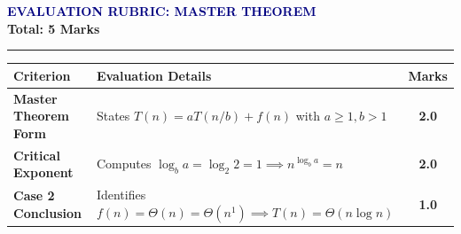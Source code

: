 \documentclass[11pt,a4paper]{article}
\begin{document}
\begin{center}
    {\large\bfseries\textcolor{navy}{EVALUATION RUBRIC: MASTER THEOREM}}\\[0.1cm]
    {\normalsize\textbf{Total: 5 Marks}}
\end{center}
\hrule
\vspace{0.6cm}

\begin{table}[h]
\centering
\begin{tabular}{p{4cm} p{8cm} c}
\toprule
\textbf{Criterion} & \textbf{Evaluation Details} & \textbf{Marks} \\
\midrule
\textbf{Master Theorem Form} & States $T(n) = aT(n/b) + f(n)$ with $a \ge 1, b > 1$ & \textbf{2.0} \\[0.3cm]
\textbf{Critical Exponent} & Computes $\log_b a = \log_2 2 = 1 \implies n^{\log_b a} = n$ & \textbf{2.0} \\[0.3cm]
\textbf{Case 2 Conclusion} & Identifies $f(n) = \Theta(n) = \Theta(n^1) \implies T(n) = \Theta(n \log n)$ & \textbf{1.0} \\
\bottomrule
\end{tabular}
\end{table}
\end{document}

